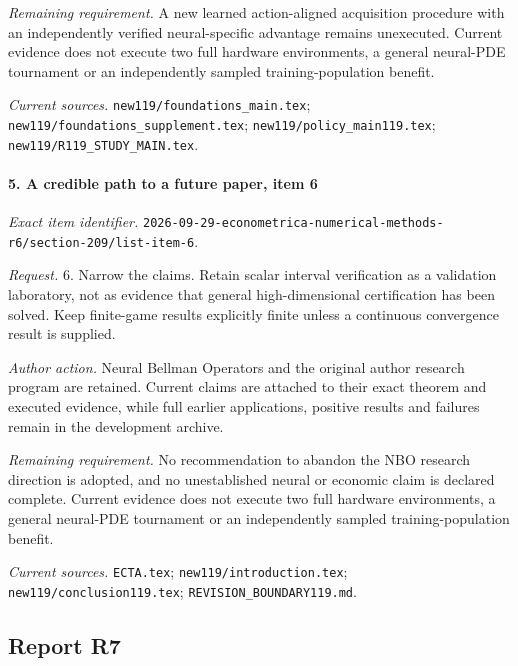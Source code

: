 \par\emph{Remaining requirement.} A new learned action-aligned acquisition procedure with an independently verified neural-specific advantage remains unexecuted. Current evidence does not execute two full hardware environments, a general neural-PDE tournament or an independently sampled training-population benefit.

\par\emph{Current sources.} \nolinkurl{new119/foundations_main.tex}; \nolinkurl{new119/foundations_supplement.tex}; \nolinkurl{new119/policy_main119.tex}; \nolinkurl{new119/R119_STUDY_MAIN.tex}.

\paragraph{5. A credible path to a future paper, item 6}

\emph{Exact item identifier.} \nolinkurl{2026-09-29-econometrica-numerical-methods-r6/section-209/list-item-6}.

\par\emph{Request.} 6. Narrow the claims. Retain scalar interval verification as a validation laboratory, not as evidence that general high-dimensional certification has been solved. Keep finite-game results explicitly finite unless a continuous convergence result is supplied.

\par\emph{Author action.} Neural Bellman Operators and the original author research program are retained. Current claims are attached to their exact theorem and executed evidence, while full earlier applications, positive results and failures remain in the development archive.

\par\emph{Remaining requirement.} No recommendation to abandon the NBO research direction is adopted, and no unestablished neural or economic claim is declared complete. Current evidence does not execute two full hardware environments, a general neural-PDE tournament or an independently sampled training-population benefit.

\par\emph{Current sources.} \nolinkurl{ECTA.tex}; \nolinkurl{new119/introduction.tex}; \nolinkurl{new119/conclusion119.tex}; \nolinkurl{REVISION_BOUNDARY119.md}.

\subsection{Report R7}

